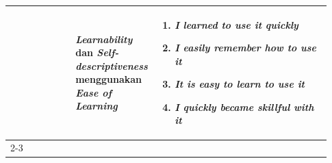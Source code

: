 \begin{longtable}{|p{0.2\linewidth}|p{0.2\linewidth}|p{0.53\linewidth}|}
                                                                  & \textbf{\textit{Learnability}} dan \textbf{\textit{Self-descriptiveness}} menggunakan \textbf{\textit{Ease of Learning}}                                & \begin{enumerate}[before=\vspace{-8pt}, leftmargin=*, nosep, series=UEL] \item \textit{I learned to use it quickly} \item \textit{I easily remember how to use it} \item \textit{It is easy to learn to use it} \item \textit{I quickly became skillful with it} \end{enumerate}                                                                                                                                                                                                                                                                                                                                                                                                                                                                                                                                                                                                                                                                                                                                                                                                                                                                                                                                                                                                                                                                                                                                             \\
      \cline{2-3}


\end{longtable}
